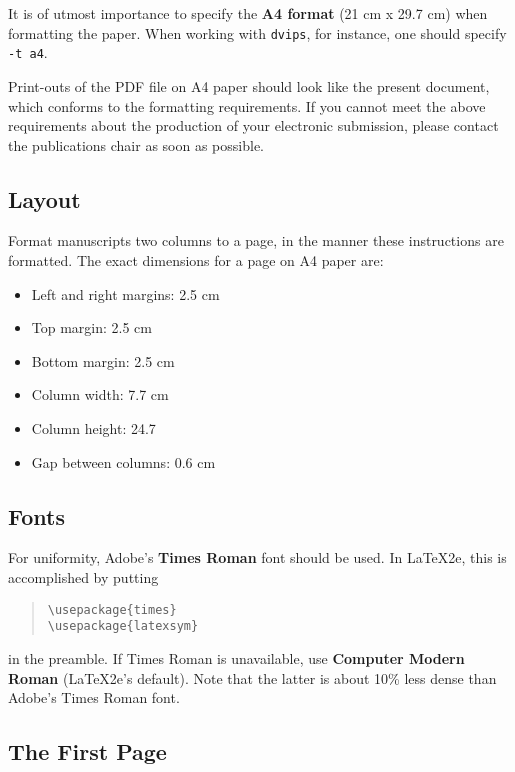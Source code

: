 \documentclass[11pt]{article}
\begin{document}
It is of utmost importance to specify the \textbf{A4 format} (21 cm
x 29.7 cm) when formatting the paper. When working with
{\tt dvips}, for instance, one should specify {\tt -t a4}.

Print-outs of the PDF file on A4 paper should look like the present document, which conforms to the formatting requirements. If you cannot meet the above requirements about the
production of your electronic submission, please contact the
publications chair as soon as possible.


\subsection{Layout}
\label{ssec:layout}

Format manuscripts two columns to a page, in the manner these
instructions are formatted. The exact dimensions for a page on A4
paper are:

\begin{itemize}
\item Left and right margins: 2.5 cm
\item Top margin: 2.5 cm
\item Bottom margin: 2.5 cm
\item Column width: 7.7 cm
\item Column height: 24.7
\item Gap between columns: 0.6 cm
\end{itemize}


\subsection{Fonts}

For uniformity, Adobe's {\bf Times Roman} font should be
used. In \LaTeX2e, this is accomplished by putting

\begin{quote}
\begin{verbatim}
\usepackage{times}
\usepackage{latexsym}
\end{verbatim}
\end{quote}
in the preamble. If Times Roman is unavailable, use {\bf Computer
  Modern Roman} (\LaTeX2e{}'s default).  Note that the latter is about
  10\% less dense than Adobe's Times Roman font.


\subsection{The First Page}
\label{ssec:first}
\end{document}
